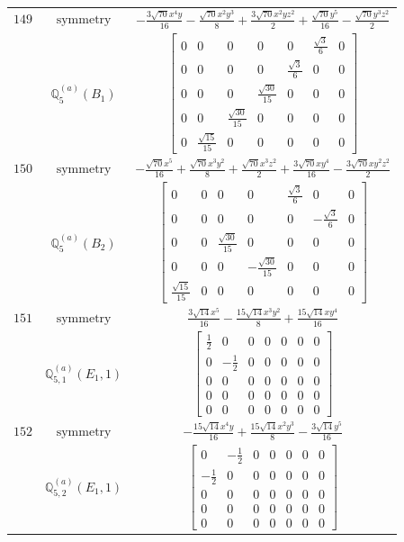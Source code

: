 \documentclass[fleqn,8pt,landscape]{jsarticle}
\begin{document}
\begin{longtable}{ccc}
$ 149 $ & $ \text{symmetry} $ & $ - \frac{3 \sqrt{70} x^{4} y}{16} - \frac{\sqrt{70} x^{2} y^{3}}{8} + \frac{3 \sqrt{70} x^{2} y z^{2}}{2} + \frac{\sqrt{70} y^{5}}{16} - \frac{\sqrt{70} y^{3} z^{2}}{2} $ \\
$  $ & $ \mathbb{Q}_{5}^{(a)}(B_{1}) $ & $ \begin{bmatrix} 0 & 0 & 0 & 0 & 0 & \frac{\sqrt{3}}{6} & 0 \\ 0 & 0 & 0 & 0 & \frac{\sqrt{3}}{6} & 0 & 0 \\ 0 & 0 & 0 & \frac{\sqrt{30}}{15} & 0 & 0 & 0 \\ 0 & 0 & \frac{\sqrt{30}}{15} & 0 & 0 & 0 & 0 \\ 0 & \frac{\sqrt{15}}{15} & 0 & 0 & 0 & 0 & 0 \end{bmatrix} $ \\ \hline
$ 150 $ & $ \text{symmetry} $ & $ - \frac{\sqrt{70} x^{5}}{16} + \frac{\sqrt{70} x^{3} y^{2}}{8} + \frac{\sqrt{70} x^{3} z^{2}}{2} + \frac{3 \sqrt{70} x y^{4}}{16} - \frac{3 \sqrt{70} x y^{2} z^{2}}{2} $ \\
$  $ & $ \mathbb{Q}_{5}^{(a)}(B_{2}) $ & $ \begin{bmatrix} 0 & 0 & 0 & 0 & \frac{\sqrt{3}}{6} & 0 & 0 \\ 0 & 0 & 0 & 0 & 0 & - \frac{\sqrt{3}}{6} & 0 \\ 0 & 0 & \frac{\sqrt{30}}{15} & 0 & 0 & 0 & 0 \\ 0 & 0 & 0 & - \frac{\sqrt{30}}{15} & 0 & 0 & 0 \\ \frac{\sqrt{15}}{15} & 0 & 0 & 0 & 0 & 0 & 0 \end{bmatrix} $ \\ \hline
$ 151 $ & $ \text{symmetry} $ & $ \frac{3 \sqrt{14} x^{5}}{16} - \frac{15 \sqrt{14} x^{3} y^{2}}{8} + \frac{15 \sqrt{14} x y^{4}}{16} $ \\
$  $ & $ \mathbb{Q}_{5,1}^{(a)}(E_{1},1) $ & $ \begin{bmatrix} \frac{1}{2} & 0 & 0 & 0 & 0 & 0 & 0 \\ 0 & - \frac{1}{2} & 0 & 0 & 0 & 0 & 0 \\ 0 & 0 & 0 & 0 & 0 & 0 & 0 \\ 0 & 0 & 0 & 0 & 0 & 0 & 0 \\ 0 & 0 & 0 & 0 & 0 & 0 & 0 \end{bmatrix} $ \\ \hline
$ 152 $ & $ \text{symmetry} $ & $ - \frac{15 \sqrt{14} x^{4} y}{16} + \frac{15 \sqrt{14} x^{2} y^{3}}{8} - \frac{3 \sqrt{14} y^{5}}{16} $ \\
$  $ & $ \mathbb{Q}_{5,2}^{(a)}(E_{1},1) $ & $ \begin{bmatrix} 0 & - \frac{1}{2} & 0 & 0 & 0 & 0 & 0 \\ - \frac{1}{2} & 0 & 0 & 0 & 0 & 0 & 0 \\ 0 & 0 & 0 & 0 & 0 & 0 & 0 \\ 0 & 0 & 0 & 0 & 0 & 0 & 0 \\ 0 & 0 & 0 & 0 & 0 & 0 & 0 \end{bmatrix} $ \\ \hline

\end{longtable}
\end{document}

